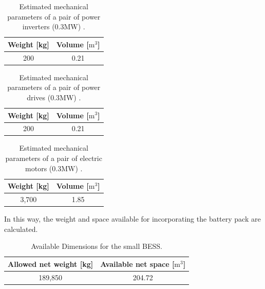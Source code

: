 \begin{table}[H]
	\centering
	\caption{Estimated mechanical parameters of a pair of power inverters (0.3MW) \cite{ABBDrives_0}.}
	\label{tab:VW_power_inverters_I}
	\begin{tabular}{|c|c|}
		\hline
		\rule{0pt}{8pt} \textbf{Weight [kg]} & \textbf{Volume [${\text{m}}^{3}$]} \\
		\hline
		\rule{0pt}{8pt} 200 & 0.21 \\
		\hline
	\end{tabular}
\end{table}

\begin{table}[H]
	\centering
	\caption{Estimated mechanical parameters of a pair of power drives (0.3MW) \cite{ABBDrives_0}.}
	\label{tab:VW_power_drives_I}
	\begin{tabular}{|c|c|}
		\hline
		\rule{0pt}{8pt} \textbf{Weight [kg]} & \textbf{Volume [${\text{m}}^{3}$]} \\
		\hline
		\rule{0pt}{8pt} 200 & 0.21 \\
		\hline
	\end{tabular}
\end{table}

\begin{table}[H]
	\centering
	\caption{Estimated mechanical parameters of a pair of electric motors (0.3MW) \cite{ABBDrives_motors}.}
	\label{tab:VW_electric_motors_I}
	\begin{tabular}{|c|c|}
		\hline
		\rule{0pt}{8pt} \textbf{Weight [kg]} & \textbf{Volume [${\text{m}}^{3}$]} \\
		\hline
		\rule{0pt}{8pt} 3,700 & 1.85 \\
		\hline
	\end{tabular}
\end{table}

In this way, the weight and space available for incorporating the battery pack are calculated.

\begin{table}[H]
	\centering
	\caption{Available Dimensions for the small BESS.}
	\label{tab:VW_BankBatt_I}
	\begin{tabular}{|c|c|}
		\hline
		\rule{0pt}{8pt} \textbf{Allowed net weight [kg]} & \textbf{Available net space [${\text{m}}^{3}$]} \\
		\hline
		\rule{0pt}{8pt} 189,850 & 204.72  \\
		\hline
	\end{tabular}
\end{table}

